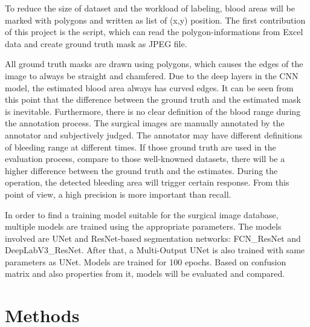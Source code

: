 \documentclass[10pt,journal,compsoc]{IEEEtran}
\begin{document}
To reduce the size of dataset and the workload of labeling, blood areas will be marked with polygons and written as list of (x,y) position.
The first contribution of this project is the script, which can read the polygon-informations from Excel data and create ground truth mask as JPEG file.
\par
All ground truth masks are drawn using polygons, which causes the edges of the image to always be straight and chamfered.
Due to the deep layers in the CNN model, the estimated blood area always has curved edges.
It can be seen from this point that the difference between the ground truth and the estimated mask is inevitable.
\linebreak Furthermore, there is no clear definition of the blood range during the annotation process.
The surgical images are \linebreak manually annotated by the annotator and subjectively judged.
The annotator may have different definitions of bleeding range at different times. 
If those ground truth are used in the evaluation process, compare to those \linebreak well-knowned datasets, there will be a higher difference between the ground truth and the estimates.
During the operation, the detected bleeding area will trigger certain response. 
From this point of view, a high precision is more important than recall.
\par
In order to find a training model suitable for the \linebreak surgical image database, multiple models are trained using the appropriate parameters.
The models involved are \linebreak UNet\cite{ronnebergerUNet} and ResNet-based segmentation networks: FCN\_ResNet\cite{longResNet} and DeepLabV3\_ResNet\cite{chenResNet}. After that, a Multi-Output UNet\cite{sunMultiOutUNet} is also trained with same parameters as UNet.
Models are trained for 100 epochs. 
Based on confusion matrix and also properties from it, models will be evaluated and compared.

\section{Methods}
\end{document}
